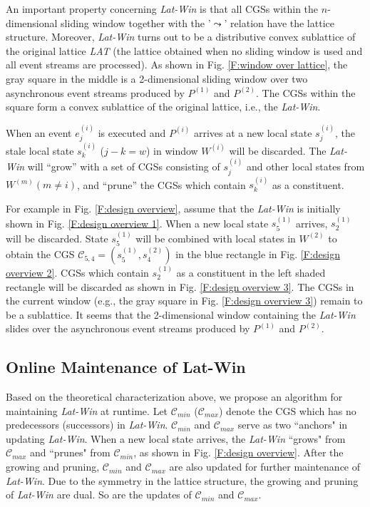 \documentclass[12pt,journal,letterpaper,compsoc]{IEEEtran}
\begin{document}
An important property concerning {\it Lat-Win} is that all CGSs within the $n$-dimensional sliding window together with the '$\leadsto$' relation have the lattice structure. Moreover, {\it Lat-Win} turns out to be a distributive convex sublattice of the original lattice {\it LAT} (the lattice obtained when no sliding window is used and all event streams are processed). As shown in Fig. \ref{F:window over lattice}, the gray square in the middle is a 2-dimensional sliding window over two asynchronous event streams produced by $P^{(1)}$ and $P^{(2)}$. The CGSs within the square form a convex sublattice of the original lattice, i.e., the {\it Lat-Win}.

When an event $e^{(i)}_{j}$ is executed and $P^{(i)}$ arrives at a new local state $s^{(i)}_j$, the stale local state $s^{(i)}_k$ ($j - k = w$) in window $W^{(i)}$ will be discarded. The {\it Lat-Win} will ``grow'' with a set of CGSs consisting of $s^{(i)}_j$ and other local states from $W^{(m)} (m \neq i)$, and ``prune'' the CGSs which contain $s^{(i)}_k$ as a constituent.

For example in Fig. \ref{F:design overview}, assume that the {\it Lat-Win} is initially shown in Fig. \ref{F:design overview 1}. When a new local state $s^{(1)}_{5}$ arrives, $s^{(1)}_2$ will be discarded. State $s^{(1)}_{5}$ will be combined with local states in $W^{(2)}$ to obtain the CGS $\mathcal{C}_{5,4} = (s^{(1)}_5, s^{(2)}_4)$ in the blue rectangle in Fig. \ref{F:design overview 2}. CGSs which contain $s^{(1)}_2$ as a constituent in the left shaded rectangle will be discarded as shown in Fig. \ref{F:design overview 3}. The CGSs in the current window (e.g., the gray square in Fig. \ref{F:design overview 3}) remain to be a sublattice. It seems that the 2-dimensional window containing the {\it Lat-Win} slides over the asynchronous event streams produced by $P^{(1)}$ and $P^{(2)}$.

\subsection{Online Maintenance of Lat-Win}

Based on the theoretical characterization above, we propose an algorithm for maintaining {\it Lat-Win} at runtime. Let $\mathcal{C}_{min}$ ($\mathcal{C}_{max}$) denote the CGS which has no predecessors (successors) in {\it Lat-Win}. $\mathcal{C}_{min}$ and $\mathcal{C}_{max}$ serve as two ``anchors" in updating {\it Lat-Win}. When a new local state arrives, the {\it Lat-Win} ``grows" from $\mathcal{C}_{max}$ and ``prunes" from $\mathcal{C}_{min}$, as shown in Fig. \ref{F:design overview}. After the growing and pruning, $\mathcal{C}_{min}$ and $\mathcal{C}_{max}$ are also updated for further maintenance of {\it Lat-Win}. Due to the symmetry in the lattice structure, the growing and pruning of {\it Lat-Win} are dual. So are the updates of $\mathcal{C}_{min}$ and $\mathcal{C}_{max}$.
\end{document}
